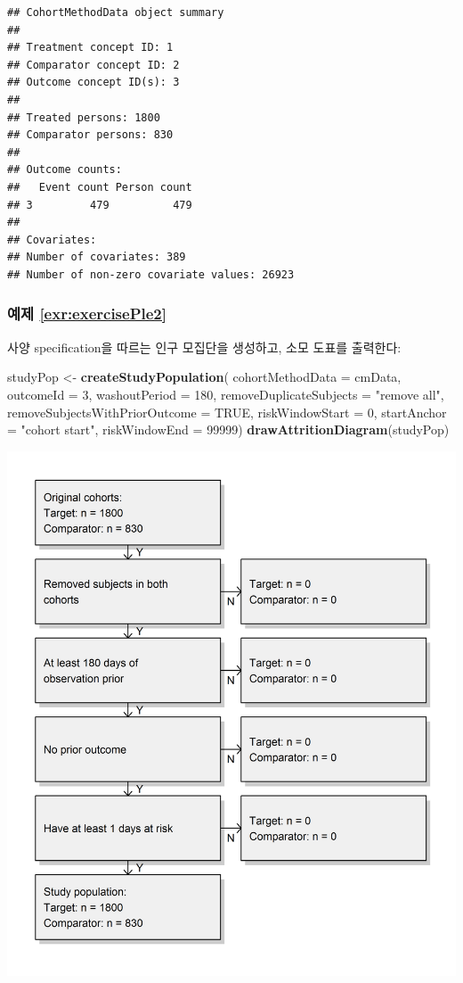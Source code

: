 \documentclass[10.5pt]{book}
\newenvironment{Shaded}{\begin{snugshade}}{\end{snugshade}}
\newcommand{\KeywordTok}[1]{\textcolor[rgb]{0.13,0.29,0.53}{\textbf{#1}}}
\newcommand{\DataTypeTok}[1]{\textcolor[rgb]{0.13,0.29,0.53}{#1}}
\newcommand{\DecValTok}[1]{\textcolor[rgb]{0.00,0.00,0.81}{#1}}
\newcommand{\StringTok}[1]{\textcolor[rgb]{0.31,0.60,0.02}{#1}}
\newcommand{\OtherTok}[1]{\textcolor[rgb]{0.56,0.35,0.01}{#1}}
\newcommand{\NormalTok}[1]{#1}
\theoremstyle{definition}
\theoremstyle{definition}
\theoremstyle{definition}
\theoremstyle{remark}
\begin{document}
\begin{verbatim}
## CohortMethodData object summary
## 
## Treatment concept ID: 1
## Comparator concept ID: 2
## Outcome concept ID(s): 3
## 
## Treated persons: 1800
## Comparator persons: 830
## 
## Outcome counts:
##   Event count Person count
## 3         479          479
## 
## Covariates:
## Number of covariates: 389
## Number of non-zero covariate values: 26923
\end{verbatim}

\subsubsection*{예제 \ref{exr:exercisePle2}}\label{-refexrexerciseple2}

사양 specification을 따르는 인구 모집단을 생성하고, 소모 도표를
출력한다:

\begin{Shaded}
\begin{Highlighting}[]
\NormalTok{studyPop <-}\StringTok{ }\KeywordTok{createStudyPopulation}\NormalTok{(}
  \DataTypeTok{cohortMethodData =}\NormalTok{ cmData,}
  \DataTypeTok{outcomeId =} \DecValTok{3}\NormalTok{,}
  \DataTypeTok{washoutPeriod =} \DecValTok{180}\NormalTok{,}
  \DataTypeTok{removeDuplicateSubjects =} \StringTok{"remove all"}\NormalTok{,}
  \DataTypeTok{removeSubjectsWithPriorOutcome =} \OtherTok{TRUE}\NormalTok{,}
  \DataTypeTok{riskWindowStart =} \DecValTok{0}\NormalTok{,}
  \DataTypeTok{startAnchor =} \StringTok{"cohort start"}\NormalTok{,}
  \DataTypeTok{riskWindowEnd =} \DecValTok{99999}\NormalTok{)}
\KeywordTok{drawAttritionDiagram}\NormalTok{(studyPop)}
\end{Highlighting}
\end{Shaded}

\begin{center}\includegraphics[width=0.8\linewidth]{images/SuggestedAnswers/attrition} \end{center}
\end{document}
